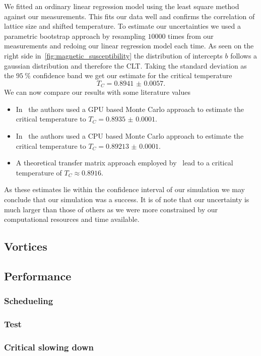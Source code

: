 We fitted an ordinary linear regression model using the least square method against our measurements. This fits our data well and confirms the correlation of lattice size and shifted temperature. To estimate our uncertainties we used a parametric bootstrap approach by resampling $\num{10 000}$ times from our measurements and redoing our linear regression model each time. As seen on the right side in~\cref{fig:magnetic_susceptibility} the distribution of intercepts $b$ follows a gaussian distribution and therefore the CLT. Taking the standard deviation as the $\SI{95}{\percent}$ confidence band we get our estimate for the critical temperature
\begin{equation}
	T_C = \num{0.8941(57)}.
\end{equation}
We can now compare our results with some literature values
\begin{itemize}
	\item In~\citet{literature_gpu} the authors used a GPU based Monte Carlo approach to estimate the critical temperature to $T_C=\num{0.8935(1)}$.
	\item In~\citet{literature_cpu} the authors used a CPU based Monte Carlo approach to estimate the critical temperature to $T_C=\num{0.89213(10)}$.
	\item A theoretical transfer matrix approach employed by~\cite{literature_theo} lead to a critical temperature of $T_C \approx \num{0.8916}$.
\end{itemize}
As these estimates lie within the confidence interval of our simulation we may conclude that our simulation was a success. It is of note that our uncertainty is much larger than those of others as we were more constrained by our computational resources and time available.

\subsection{Vortices}

\subsection{Performance}
\subsubsection{Schedueling}

\subsubsection{Test}

\subsubsection{Critical slowing down}
